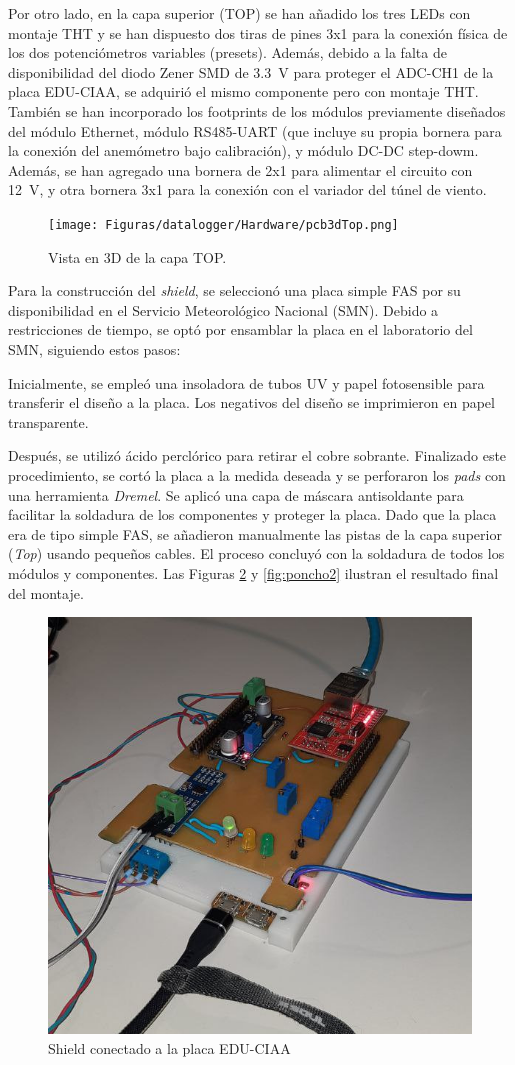 Por otro lado, en la capa superior (TOP) se han añadido los tres LEDs con montaje THT y se han dispuesto dos tiras de pines 3x1 para la conexión física de los dos potenciómetros variables (presets). Además, debido a la falta de disponibilidad del diodo Zener SMD de \SI{3.3}{\volt} para proteger el ADC-CH1 de la placa EDU-CIAA, se adquirió el mismo componente pero con montaje THT. También se han incorporado los footprints de los módulos previamente diseñados del módulo Ethernet, módulo RS485-UART (que incluye su propia bornera para la conexión del anemómetro bajo calibración), y módulo DC-DC step-dowm. Además, se han agregado una bornera de 2x1 para alimentar el circuito con \SI{12}{\volt}, y otra bornera 3x1 para la conexión con el variador del túnel de viento.


\begin{figure}[H]
    \centering
    \texttt{[image: Figuras/datalogger/Hardware/pcb3dTop.png]}
    \caption{Vista en 3D de la capa TOP.}
    \label{fig:pcb3dTop}
\end{figure}

Para la construcción del \textit{shield}, se seleccionó una placa simple FAS por su disponibilidad en el Servicio Meteorológico Nacional (SMN). Debido a restricciones de tiempo, se optó por ensamblar la placa en el laboratorio del SMN, siguiendo estos pasos:

Inicialmente, se empleó una insoladora de tubos UV y papel fotosensible para transferir el diseño a la placa. Los negativos del diseño se imprimieron en papel transparente.

Después, se utilizó ácido perclórico para retirar el cobre sobrante. Finalizado este procedimiento, se cortó la placa a la medida deseada y se perforaron los \textit{pads} con una herramienta \textit{Dremel}. Se aplicó una capa de máscara antisoldante para facilitar la soldadura de los componentes y proteger la placa. Dado que la placa era de tipo simple FAS, se añadieron manualmente las pistas de la capa superior (\textit{Top}) usando pequeños cables. El proceso concluyó con la soldadura de todos los módulos y componentes. Las Figuras \ref{fig:poncho1} y \ref{fig:poncho2} ilustran el resultado final del montaje.


\begin{figure}[H]
    \centering
    \includegraphics[width=0.6\linewidth]{Figuras/datalogger/Hardware/poncho1.jpg}
    \caption{Shield conectado a la placa EDU-CIAA}
    \label{fig:poncho1}
\end{figure}


